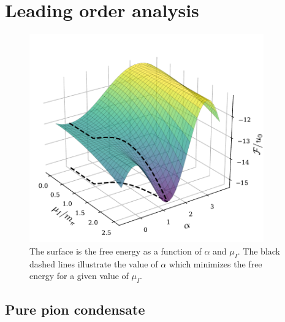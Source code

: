 \section{Leading order analysis}
\label{section: thermodynamics leading order}


\begin{figure}[htb]
    \centering
    \includegraphics[width=0.9\textwidth]{../scripts/figurer/free_energy_surface.pdf}
    \caption{
        The surface is the free energy as a function of $\alpha$ and $\mu_I$.
        The black dashed lines illustrate the value of $\alpha$ which minimizes the free energy for a given value of $\mu_I$.
    }
    \label{fig: free energy surface}
\end{figure}


\subsection{Pure pion condensate}
\label{subsection: pure pion condensate}


